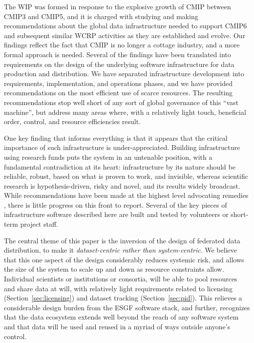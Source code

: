 \documentclass[gmd,manuscript]{copernicus}
\begin{document}
\label{sec:summary}

The WIP was formed in response to the explosive growth of CMIP between
CMIP3 and CMIP5, and it is charged with studying and making recommendations
about the global data infrastructure needed to support CMIP6 and 
subsequent similar WCRP activities as they are established and evolve.
Our findings reflect the
fact that CMIP is no longer a cottage industry, and a more formal
approach is needed. Several of the findings have been translated into
requirements on the design of the underlying software infrastructure
for data production and distribution. We have separated infrastructure
development into requirements, implementation, and operations phases,
and we have provided recommendations on the most efficient use of scarce
resources. The resulting recommendations stop well short of any sort
of global governance of this ``vast machine'', but address many areas
where, with a relatively light touch, beneficial order, control,
and resource efficiencies result.

One key finding that informs everything is that it
appears that the critical importance of such infrastructure is
under-appreciated. Building infrastructure using research funds puts
the system in an untenable position, with a fundamental contradiction
at its heart: infrastructure by its nature should be reliable, robust,
based on what is proven to work, and invisible, whereas scientific
research is hypothesis-driven, risky and novel, and its results widely
broadcast. While recommendations have been made at the highest level
advocating remedies
\citep[e.g.,][]{ref:nasem2012}, there is little progress on this front
to report. Several of the key pieces of infrastructure software
described here are built and tested by volunteers or short-term
project staff.

The central theme of this paper is the inversion of the design of
federated data distribution, to make it \emph{dataset-centric rather
  than system-centric}. We believe that this one aspect of the design
considerably reduces systemic risk, and allows the size of the system
to scale up and down as resource constraints allow. Individual
scientists or institutions or consortia, will be able to pool
resources and share data at will, with relatively light requirements
related to licensing (Section~\ref{sec:licensing}) and dataset
tracking (Section~\ref{sec:pid}). This relieves a considerable design
burden from the ESGF software stack, and further, recognizes that the
data ecosystem extends well beyond the reach of any software system
and that data will be used and reused in a myriad of ways outside anyone's
control.
\end{document}
